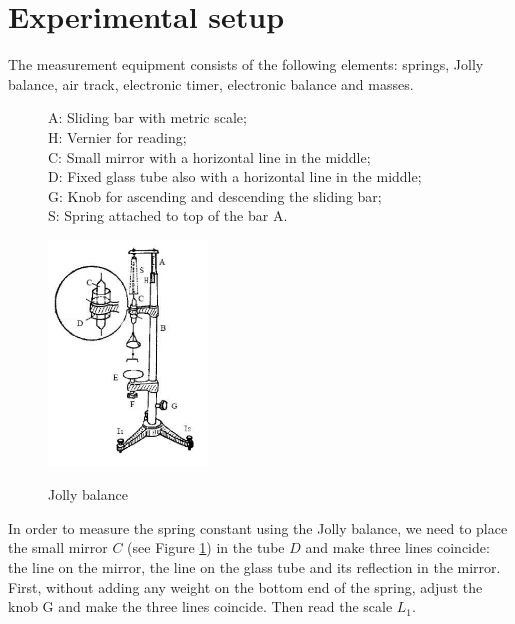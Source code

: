 \section{Experimental setup}
    The measurement equipment consists of the following elements: springs, Jolly balance, air track, electronic timer, electronic balance and masses.\\
    \begin{figure}[h]
        \centering
        \begin{minipage}{0.4\linewidth}
            A: Sliding bar with metric scale;\\
            H: Vernier for reading;\\
            C: Small mirror with a horizontal line in the middle;\\
            D: Fixed glass tube also with a horizontal line in the middle;\\
            G: Knob for ascending and descending the sliding bar;\\
            S: Spring attached to top of the bar A.\\
        \end{minipage}
        \hspace{0.8cm}
        \begin{minipage}{0.35\linewidth}
            \label{jolly}
            \includegraphics[height=6cm]{images/2.png}
        \end{minipage}
        \caption{Jolly balance}
    \end{figure}

    In order to measure the spring constant using the Jolly balance, we need to place the small mirror $C$ (see Figure \ref{jolly}) in the tube $D$ and make three lines coincide: the line on the mirror, the line on the glass tube and its reflection in the mirror. First, without adding any weight on the bottom end of the spring, adjust the knob G and make the three lines coincide. Then read the scale $L_1$.
    
